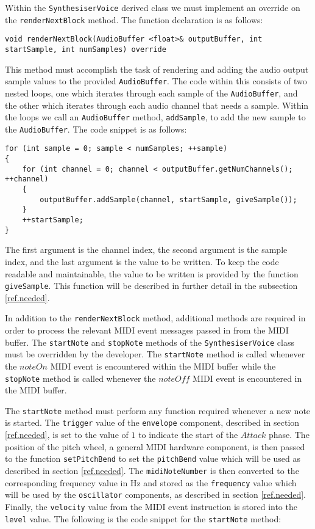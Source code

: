 \documentclass[a4paper,12pt]{report}
\begin{document}
Within the \texttt{SynthesiserVoice} derived class we must implement an override on the \texttt{renderNextBlock} method. The function declaration is as follows:
\begin{lstlisting}
void renderNextBlock(AudioBuffer <float>& outputBuffer, int startSample, int numSamples) override
\end{lstlisting}
This method must accomplish the task of rendering and adding the audio output sample values to the provided \texttt{AudioBuffer}. The code within this consists of two nested loops, one which iterates through each sample of the \texttt{AudioBuffer}, and the other which iterates through each audio channel that needs a sample. Within the loops we call an \texttt{AudioBuffer} method, \texttt{addSample}, to add the new sample to the \texttt{AudioBuffer}. The code snippet is as follows:
\begin{lstlisting}
for (int sample = 0; sample < numSamples; ++sample)
{
    for (int channel = 0; channel < outputBuffer.getNumChannels(); ++channel)
    {
        outputBuffer.addSample(channel, startSample, giveSample());
    }
    ++startSample;
}
\end{lstlisting}
The first argument is the channel index, the second argument is the sample index, and the last argument is the value to be written. To keep the code readable and maintainable, the value to be written is provided by the function \texttt{giveSample}. This function will be described in further detail in the subsection \ref{ref.needed}.

In addition to the \texttt{renderNextBlock} method, additional methods are required in order to process the relevant MIDI event messages passed in from the MIDI buffer. The \texttt{startNote} and \texttt{stopNote} methods of the \texttt{SynthesiserVoice} class must be overridden by the developer. The \texttt{startNote} method is called whenever the $noteOn$ MIDI event is encountered within the MIDI buffer while the \texttt{stopNote} method is called whenever the $noteOff$ MIDI event is encountered in the MIDI buffer.	

The \texttt{startNote} method must perform any function required whenever a new note is started. The \texttt{trigger} value of the \texttt{envelope} component, described in section \ref{ref.needed}, is set to the value of $1$ to indicate the start of the $Attack$ phase. The position of the pitch wheel, a general MIDI hardware component, is then passed to the function \texttt{setPitchBend} to set the \texttt{pitchBend} value which will be used as described in section \ref{ref.needed}. The \texttt{midiNoteNumber} is then converted to the corresponding frequency value in Hz and stored as the \texttt{frequency} value which will be used by the \texttt{oscillator} components, as described in section \ref{ref.needed}. Finally, the \texttt{velocity} value from the MIDI event instruction is stored into the \texttt{level} value. The following is the code snippet for the \texttt{startNote} method:
\end{document}
